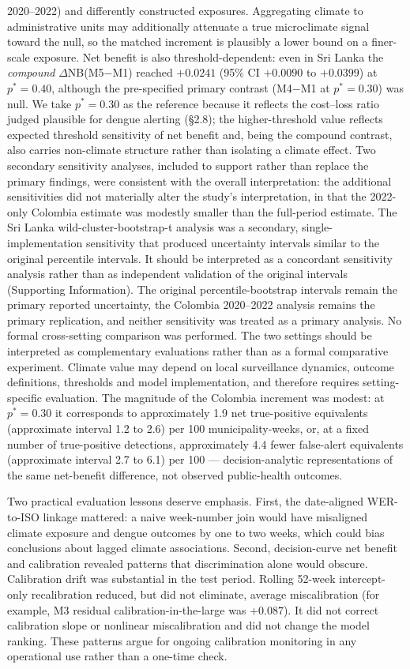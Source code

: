 \documentclass[11pt,a4paper]{article}
\begin{document}
2020--2022) and differently constructed exposures. Aggregating climate to administrative units may additionally attenuate a true microclimate signal toward the null, so the matched increment is plausibly a lower bound on a finer-scale exposure. Net benefit is also threshold-dependent: even in Sri Lanka the \emph{compound} $\Delta$NB(M5$-$M1) reached $+0.0241$ (95\% CI $+0.0090$ to $+0.0399$) at $p^*=0.40$, although the pre-specified primary contrast (M4$-$M1 at $p^*=0.30$) was null. We take $p^*=0.30$ as the reference because it reflects the cost--loss ratio judged plausible for dengue alerting (\S2.8); the higher-threshold value reflects expected threshold sensitivity of net benefit and, being the compound contrast, also carries non-climate structure rather than isolating a climate effect. Two secondary sensitivity analyses, included to support rather than replace the primary findings, were consistent with the overall interpretation: the additional sensitivities did not materially alter the study's interpretation, in that the 2022-only Colombia estimate was modestly smaller than the full-period estimate. The Sri Lanka wild-cluster-bootstrap-t analysis was a secondary, single-implementation sensitivity that produced uncertainty intervals similar to the original percentile intervals. It should be interpreted as a concordant sensitivity analysis rather than as independent validation of the original intervals (Supporting Information). The original percentile-bootstrap intervals remain the primary reported uncertainty, the Colombia 2020--2022 analysis remains the primary replication, and neither sensitivity was treated as a primary analysis. No formal cross-setting comparison was performed. The two settings should be interpreted as complementary evaluations rather than as a formal comparative experiment. Climate value may depend on local surveillance dynamics, outcome definitions, thresholds and model implementation, and therefore requires setting-specific evaluation. The magnitude of the Colombia increment was modest: at $p^*=0.30$ it corresponds to approximately 1.9 net true-positive equivalents (approximate interval 1.2 to 2.6) per 100 municipality-weeks, or, at a fixed number of true-positive detections, approximately 4.4 fewer false-alert equivalents (approximate interval 2.7 to 6.1) per 100 --- decision-analytic representations of the same net-benefit difference, not observed public-health outcomes.

Two practical evaluation lessons deserve emphasis. First, the date-aligned WER-to-ISO linkage mattered: a naive week-number join would have misaligned climate exposure and dengue outcomes by one to two weeks, which could bias conclusions about lagged climate associations. Second, decision-curve net benefit and calibration revealed patterns that discrimination alone would obscure. Calibration drift was substantial in the test period. Rolling 52-week intercept-only recalibration reduced, but did not eliminate, average miscalibration (for example, M3 residual calibration-in-the-large was $+0.087$). It did not correct calibration slope or nonlinear miscalibration and did not change the model ranking. These patterns argue for ongoing calibration monitoring in any operational use rather than a one-time check.
\end{document}
